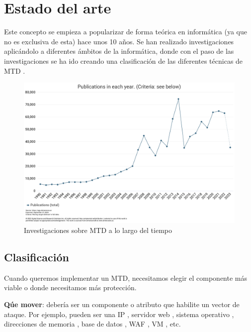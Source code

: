 \chapter{Estado del arte}

Este concepto se empieza a popularizar de forma teórica en informática (ya que no es exclusiva de esta) hace unos 10 años. Se han realizado investigaciones aplicándolo a diferentes ámbitos de la informática, donde con el paso de las investigaciones se ha ido creando una clasificación de las diferentes técnicas de MTD \cite{big-state-of-art}.
\begin{figure}[h]
    \centering
        \includegraphics[width=\linewidth]{./imagenes/busquedasMTD.png}
        \caption{Investigaciones sobre MTD a lo largo del tiempo}
\end{figure}

\section{Clasificación}
Cuando queremos implementar un MTD, necesitamos elegir el componente más viable o donde necesitamos más protección.

\textbf{Qúe mover}: debería ser un componente o atributo que habilite un vector de ataque. Por ejemplo, pueden ser una IP \cite{MTD-SDN+decoy}\cite{MTD-ipshuffling+honeypots}\cite{MTD-POC-empresa}, servidor web \cite{MTD-DARE}\cite{MTD-MORE+DARE+Java}, sistema operativo \cite{MTD-MORE+DARE+Java}, direcciones de memoria \cite{MTD-ASR}, base de datos \cite{MTD-arab}, WAF \cite{MTD-WAF}, VM \cite{MTD-POC-empresa}\cite{MTD-DARE}\cite{SCIT-base}, etc.

